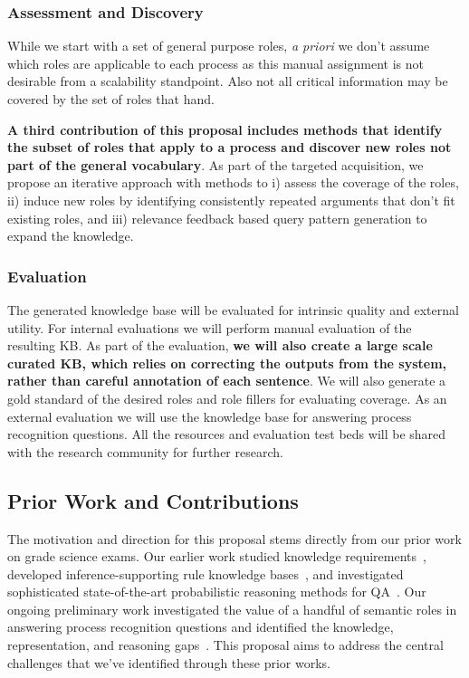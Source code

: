 \subsubsection*{Assessment and Discovery}
While we start with a set of general purpose roles, {\em a priori} we don't assume which roles are applicable to each process as this manual assignment is not desirable from a scalability standpoint.
Also not all critical information may be covered by the set of roles that hand.

{\bf A third contribution of this proposal includes methods that identify the subset of roles that apply to a process and discover new roles not part of the general vocabulary}. 
As part of the targeted acquisition, we propose an iterative approach with methods to i) assess the coverage of the roles, ii) induce new roles by identifying consistently repeated arguments that don't fit existing roles, and iii) relevance feedback based query pattern generation to expand the knowledge.

\subsubsection*{Evaluation}

The generated knowledge base will be evaluated for intrinsic quality and external utility. For internal evaluations we will perform manual evaluation of the resulting KB. As part of the evaluation, {\bf we will also create a large scale curated KB, which relies on correcting the outputs from the system, rather than careful annotation of each sentence}. We will also generate a gold standard of the desired roles and role fillers for evaluating coverage. As an external evaluation we will use the knowledge base for answering process recognition questions. All the resources and evaluation test beds will be shared with the research community for further research.

\subsection{Prior Work and Contributions}

The motivation and direction for this proposal stems directly from our prior work on grade science exams.  Our earlier work studied knowledge requirements~\cite{chb2013:akbc}, developed inference-supporting rule knowledge bases~\cite{clark2014:akbc}, and investigated sophisticated state-of-the-art probabilistic reasoning methods for QA~\cite{khot2015:emlnlp}. Our ongoing preliminary work investigated the value of a handful of semantic roles in answering process recognition questions and identified the knowledge, representation, and reasoning gaps~\cite{louvan2015:kcap}. This proposal aims to address the central challenges that we've identified through these prior works.

